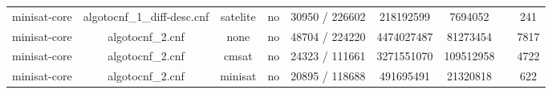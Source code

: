 \begin{appendices}
\begin{table}[p]
\begin{center}
\begin{tabular}{l|cccccccc}
  minisat-core                   & algotocnf\_1\_diff-desc.cnf    & satelite   & no    & 30950 / 226602 & 218192599 & 7694052   &            & 241 \\ %
  minisat-core                   & algotocnf\_2.cnf               & none       & no    & 48704 / 224220 & 4474027487 & 81273454  &            & 7817 \\ %
  minisat-core                   & algotocnf\_2.cnf               & cmsat      & no    & 24323 / 111661 & 3271551070 & 109512958 &            & 4722 \\ %
  minisat-core                   & algotocnf\_2.cnf               & minisat    & no    & 20895 / 118688 & 491695491 & 21320818  &            & 622 \\ %
    \end{tabular}
  \end{center}
\end{table}

\newpage


\end{appendices}
